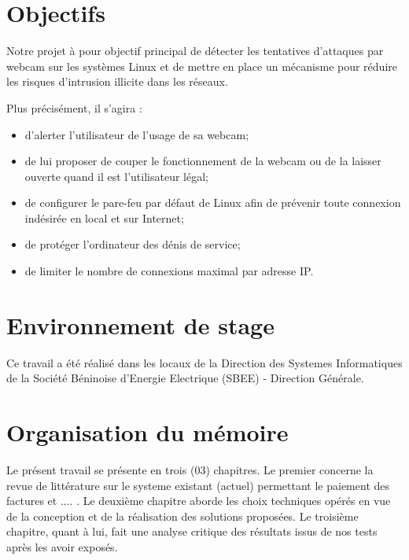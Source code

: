     \section{Objectifs}
    \small{ 
	  Notre projet à pour objectif principal de détecter les tentatives d'attaques par webcam sur les systèmes Linux et de mettre en place un mécanisme pour réduire les risques d'intrusion illicite dans les réseaux.
	        
	  Plus précisément, il s'agira :
	
    \begin{itemize}
	\item d'alerter l'utilisateur de l'usage de sa webcam;
	\item de lui proposer de couper le fonctionnement de la webcam ou de la laisser ouverte quand il est l'utilisateur légal;
	\item de configurer le pare-feu par défaut de Linux afin de prévenir toute connexion indésirée en local et sur Internet;
	\item de protéger l'ordinateur des dénis de service;
        \item de limiter le nombre de connexions maximal par adresse IP.
    \end{itemize}
    }

    \section{Environnement de stage}
      \small{
	Ce travail a \'et\'e r\'ealis\'e dans les locaux de la Direction des Systemes Informatiques de la Soci\'et\'e B\'eninoise d'Energie Electrique (SBEE) - Direction G\'en\'erale. 
      }
      
    \section{Organisation du mémoire}
	\small{
	  Le présent travail se présente en trois (03) chapitres. Le premier concerne la revue de littérature sur le systeme existant (actuel) permettant le paiement des factures et .... . Le deuxième chapitre aborde les choix techniques opérés en vue de la conception et de la réalisation des solutions proposées. Le troisième chapitre, quant à lui, fait une analyse critique des résultats issus de nos tests après les avoir exposés.
	}


